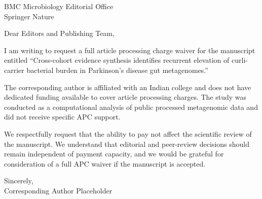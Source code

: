 \documentclass[12pt]{letter}
\begin{document}
\begin{letter}{BMC Microbiology Editorial Office\\Springer Nature}
\opening{Dear Editors and Publishing Team,}

I am writing to request a full article processing charge waiver for the manuscript entitled ``Cross-cohort evidence synthesis identifies recurrent elevation of curli-carrier bacterial burden in Parkinson's disease gut metagenomes.''

The corresponding author is affiliated with an Indian college and does not have dedicated funding available to cover article processing charges. The study was conducted as a computational analysis of public processed metagenomic data and did not receive specific APC support.

We respectfully request that the ability to pay not affect the scientific review of the manuscript. We understand that editorial and peer-review decisions should remain independent of payment capacity, and we would be grateful for consideration of a full APC waiver if the manuscript is accepted.

\closing{Sincerely,\\Corresponding Author Placeholder}

\end{letter}
\end{document}
